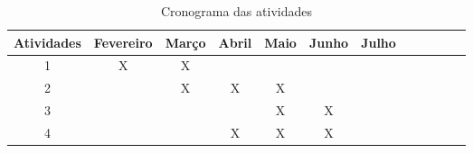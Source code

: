  \begin{center}
     \begin{longtable}{|c|c|c|c|c|c|c|c|c|c|c|c|}
     \caption{Cronograma das atividades}\label{table:cronograma}\\ \hline
   
     Atividades & 
     Fevereiro  & 
     Março      & 
     Abril      & 
     Maio       & 
     Junho      &
     Julho    
     \\ \hline
 	
     1  & X & X &   &   &   &   \\ \hline
     2  &   & X & X & X &   &   \\ \hline
     3  &   &   &   & X & X &   \\ \hline
     4  &   &   & X & X & X &   \\ \hline

     \end{longtable}
 \end{center}








	






	
	
